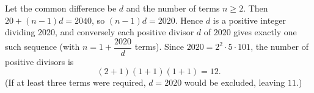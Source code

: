 Let the common difference be $d$ and the number of terms $n\ge2$. Then $20+(n-1)d=2040$, so $(n-1)d=2020$. Hence $d$ is a positive integer dividing $2020$, and conversely each positive divisor $d$ of $2020$ gives exactly one such sequence (with $n=1+\dfrac{2020}{d}$ terms). Since $2020=2^2\cdot5\cdot101$, the number of positive divisors is
\[(2+1)(1+1)(1+1)=\boxed{12}.\]
(If at least three terms were required, $d=2020$ would be excluded, leaving $11$.)
